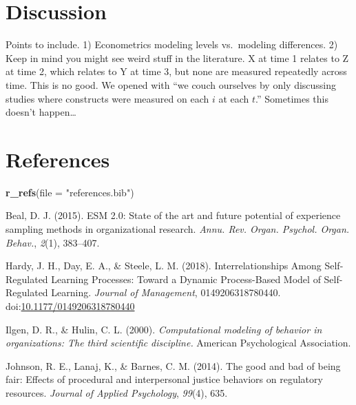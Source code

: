 \documentclass[english,,man]{apa6}
\newenvironment{Shaded}{\begin{snugshade}}{\end{snugshade}}
\newcommand{\DataTypeTok}[1]{\textcolor[rgb]{0.13,0.29,0.53}{#1}}
\newcommand{\KeywordTok}[1]{\textcolor[rgb]{0.13,0.29,0.53}{\textbf{#1}}}
\newcommand{\NormalTok}[1]{#1}
\newcommand{\StringTok}[1]{\textcolor[rgb]{0.31,0.60,0.02}{#1}}
\theoremstyle{definition}
\theoremstyle{definition}
\theoremstyle{definition}
\theoremstyle{remark}
\begin{document}
\hypertarget{discussion}{%
\section{Discussion}\label{discussion}}

Points to include. 1) Econometrics modeling levels vs.~modeling
differences. 2) Keep in mind you might see weird stuff in the
literature. X at time 1 relates to Z at time 2, which relates to Y at
time 3, but none are measured repeatedly across time. This is no good.
We opened with \enquote{we couch ourselves by only discussing studies
where constructs were measured on each \(i\) at each \(t\).} Sometimes
this doesn't happen\ldots{}

\newpage

\hypertarget{references}{%
\section{References}\label{references}}

\begin{Shaded}
\begin{Highlighting}[]
\KeywordTok{r_refs}\NormalTok{(}\DataTypeTok{file =} \StringTok{"references.bib"}\NormalTok{)}
\end{Highlighting}
\end{Shaded}

\setlength{\parindent}{-0.5in}
\setlength{\leftskip}{0.5in}

\hypertarget{refs}{}
\leavevmode\hypertarget{ref-beal_esm_2015}{}%
Beal, D. J. (2015). ESM 2.0: State of the art and future potential of
experience sampling methods in organizational research. \emph{Annu. Rev.
Organ. Psychol. Organ. Behav.}, \emph{2}(1), 383--407.

\leavevmode\hypertarget{ref-hardy_interrelationships_2018}{}%
Hardy, J. H., Day, E. A., \& Steele, L. M. (2018). Interrelationships
Among Self-Regulated Learning Processes: Toward a Dynamic Process-Based
Model of Self-Regulated Learning. \emph{Journal of Management},
0149206318780440.
doi:\href{https://doi.org/10.1177/0149206318780440}{10.1177/0149206318780440}

\leavevmode\hypertarget{ref-ilgen_computational_2000}{}%
Ilgen, D. R., \& Hulin, C. L. (2000). \emph{Computational modeling of
behavior in organizations: The third scientific discipline.} American
Psychological Association.

\leavevmode\hypertarget{ref-johnson_good_2014}{}%
Johnson, R. E., Lanaj, K., \& Barnes, C. M. (2014). The good and bad of
being fair: Effects of procedural and interpersonal justice behaviors on
regulatory resources. \emph{Journal of Applied Psychology},
\emph{99}(4), 635.
\end{document}
